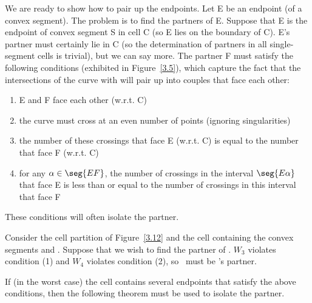 We are ready to show how to pair up the endpoints.
Let E be an endpoint (of a convex segment).
The problem is to find the partners of E.
Suppose that E is the endpoint of convex segment S in cell C (so E lies on
the boundary of C).
E's partner must certainly lie in C (so the determination of partners 
in all single-segment cells is trivial), but we can say more.
The partner F must satisfy the following conditions (exhibited in 
Figure~\ref{3.5}), which capture the fact that 
the intersections of the curve with 
will pair up into couples that face each other:
\begin{enumerate}
\item 
	E and F face each other (w.r.t. C)
\item
	the curve must cross  at an even number of points (ignoring
	singularities)
\item 	
	the number of these crossings that face E (w.r.t. C)
	is equal to the number that face F (w.r.t. C)
\item
	for any $\alpha \in \seg{EF}$, the number of crossings in the
	interval $\seg{E\alpha}$ that face E is less than or equal to
	the number of crossings in this interval that face F
\end{enumerate}
%
These conditions will often isolate the partner.
%
\begin{example}
Consider the cell partition of Figure~\ref{3.12} and the cell containing
the convex segments \arc{\wo\wt} and .
Suppose that we wish to find the partner of \wo.
$W_{3}$ violates condition (1) and $W_{4}$ violates condition (2), 
so \wt\ must be \wo's partner.
\end{example}
%
If (in the worst case) the cell contains several endpoints that satisfy
the above conditions, then the following theorem must be used
to isolate the partner.

